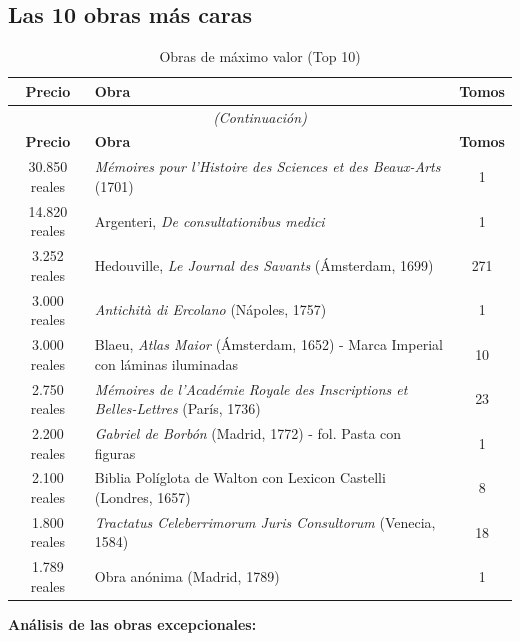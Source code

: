 \documentclass[12pt,a4paper]{article}
\begin{document}
\subsection{Las 10 obras más caras}

\begin{longtable}{cp{6cm}c}
\caption{Obras de máximo valor (Top 10)} \\
\toprule
\textbf{Precio} & \textbf{Obra} & \textbf{Tomos} \\
\midrule
\endfirsthead
\multicolumn{3}{c}{\textit{(Continuación)}} \\
\toprule
\textbf{Precio} & \textbf{Obra} & \textbf{Tomos} \\
\midrule
\endhead
\bottomrule
\endfoot

30.850 reales & \textit{Mémoires pour l'Histoire des Sciences et des Beaux-Arts} (1701) & 1 \\
14.820 reales & Argenteri, \textit{De consultationibus medici} & 1 \\
3.252 reales & Hedouville, \textit{Le Journal des Savants} (Ámsterdam, 1699) & 271 \\
3.000 reales & \textit{Antichità di Ercolano} (Nápoles, 1757) & 1 \\
3.000 reales & Blaeu, \textit{Atlas Maior} (Ámsterdam, 1652) - Marca Imperial con láminas iluminadas & 10 \\
2.750 reales & \textit{Mémoires de l'Académie Royale des Inscriptions et Belles-Lettres} (París, 1736) & 23 \\
2.200 reales & \textit{Gabriel de Borbón} (Madrid, 1772) - fol. Pasta con figuras & 1 \\
2.100 reales & Biblia Políglota de Walton con Lexicon Castelli (Londres, 1657) & 8 \\
1.800 reales & \textit{Tractatus Celeberrimorum Juris Consultorum} (Venecia, 1584) & 18 \\
1.789 reales & Obra anónima (Madrid, 1789) & 1 \\
\end{longtable}

\textbf{Análisis de las obras excepcionales:}
\end{document}
